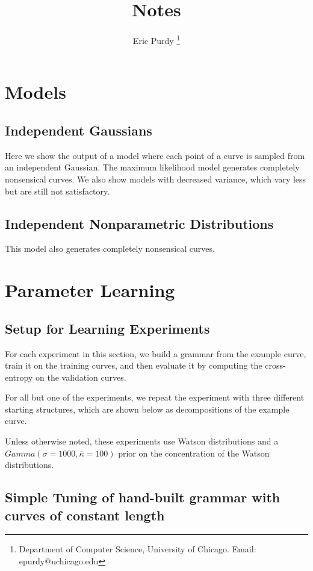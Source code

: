 \documentclass{book}
\title{Notes}
\author{Eric Purdy \footnote{Department of Computer Science, University of Chicago. Email: epurdy@uchicago.edu}}
\begin{document}
\chapter{Models}

\section{Independent Gaussians}
Here we show the output of a model where each point of a curve is
sampled from an independent Gaussian. The maximum likelihood model
generates completely nonsensical curves. We also show models with
decreased variance, which vary less but are still not satisfactory.



\section{Independent Nonparametric Distributions}

This model also generates completely nonsensical curves.



\chapter{Parameter Learning}

\section{Setup for Learning Experiments}

For each experiment in this section, we build a grammar from the
example curve, train it on the training curves, and then evaluate it
by computing the cross-entropy on the validation curves. 

For all but one of the experiments, we repeat the experiment with
three different starting structures, which are shown below as
decompositions of the example curve.

Unless otherwise noted, these experiments use Watson distributions and
a $Gamma(\sigma=1000, \overline{\kappa}=100)$ prior on the
concentration of the Watson distributions.



\section{Simple Tuning of hand-built grammar with curves of constant length}
\end{document}
